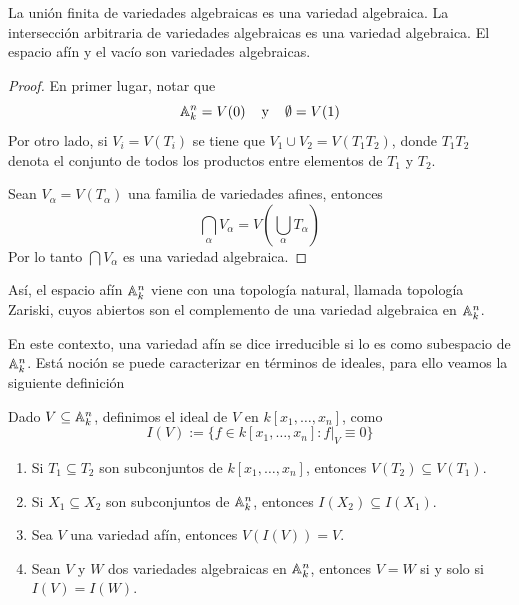 \documentclass[11pt]{article}
\begin{document}
\begin{lema}
    La unión finita de variedades algebraicas es una variedad algebraica. La intersección 
    arbitraria de variedades algebraicas es una variedad algebraica. El espacio afín y el vacío 
    son variedades algebraicas.
\end{lema}

\begin{proof}
    En primer lugar, notar que
    \begin{equation*}
        \mathbb{A}_{k}^{n}=V(0) \hspace{4mm}\text{y}\hspace{4mm} \emptyset=V(1)
    \end{equation*}
    Por otro lado, si $V_{i}=V(T_{i})$ se tiene que $V_{1}\cup V_{2}=V(T_{1}T_{2})$, donde 
    $T_{1}T_{2}$ denota el conjunto de todos los productos entre elementos de $T_{1}$ y $T_{2}$.

    Sean $V_{\alpha}=V(T_{\alpha})$ una familia de variedades afines, entonces
    \begin{equation*}
        \bigcap_{\alpha} V_{\alpha}=V\left(\bigcup_{\alpha} T_{\alpha}\right)
    \end{equation*}
    Por lo tanto $\bigcap V_{\alpha}$ es una variedad algebraica.
\end{proof}

\noindent Así, el espacio afín $\mathbb{A}_{k}^{n}$ viene con una topología natural, llamada topología
Zariski, cuyos abiertos son el complemento de una variedad algebraica en $\mathbb{A}_{k}^{n}$.

\noindent En este contexto, una variedad afín se dice irreducible si lo es como subespacio de 
$\mathbb{A}_{k}^{n}$. Está noción se puede caracterizar en términos de ideales, para ello veamos la
siguiente definición

\newpage
\begin{dfn}
    Dado $V\subseteq\mathbb{A}_{k}^{n}$, definimos el ideal de $V$ en $k[x_{1},\dots,x_{n}]$, como
    \begin{equation*}
        I(V):=\{f\in k[x_{1},\dots,x_{n}]:f|_{V}\equiv0\}
    \end{equation*}
\end{dfn}

\begin{prop} \hspace{1mm}
    \begin{enumerate}
        \setlength{\itemsep}{0pt}
        \item Si $T_{1}\subseteq T_{2}$ son subconjuntos de $k[x_{1},\dots,x_{n}]$, entonces
        $V(T_{2})\subseteq V(T_{1})$.

        \item Si $X_{1}\subseteq X_{2}$ son subconjuntos de $\mathbb{A}_{k}^{n}$, entonces 
        $I(X_{2})\subseteq I(X_{1})$.

        \item Sea $V$ una variedad afín, entonces $V(I(V))=V$.

        \item Sean $V$ y $W$ dos variedades algebraicas en $\mathbb{A}_{k}^{n}$, entonces $V=W$ si y solo 
        si $I(V)=I(W)$.
    \end{enumerate}
\end{prop}
\end{document}
